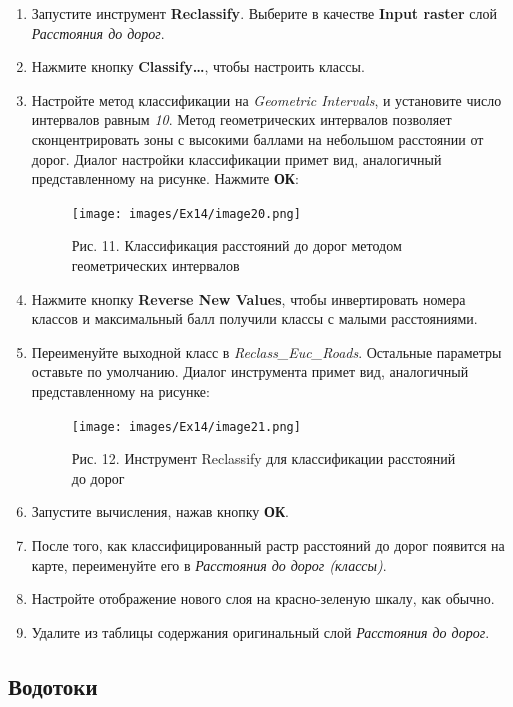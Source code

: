 \documentclass[12pt,]{book}
\begin{document}
\begin{enumerate}
\def\labelenumi{\arabic{enumi}.}
\item
  Запустите инструмент \textbf{Reclassify}. Выберите в качестве \textbf{Input raster} слой \emph{Расстояния до дорог}.
\item
  Нажмите кнопку \textbf{Classify\ldots{}}, чтобы настроить классы.
\item
  Настройте метод классификации на \emph{Geometric Intervals}, и установите число интервалов равным \emph{10}. Метод геометрических интервалов позволяет сконцентрировать зоны с высокими баллами на небольшом расстоянии от дорог. Диалог настройки классификации примет вид, аналогичный представленному на рисунке. Нажмите \textbf{ОК}:

  \begin{figure}
  \centering
  \texttt{[image: images/Ex14/image20.png]}
  \caption{Рис. 11. Классификация расстояний до дорог методом геометрических интервалов}
  \end{figure}
\item
  Нажмите кнопку \textbf{Reverse New Values}, чтобы инвертировать номера классов и максимальный балл получили классы с малыми расстояниями.
\item
  Переименуйте выходной класс в \emph{Reclass\_Euc\_Roads}. Остальные параметры оставьте по умолчанию. Диалог инструмента примет вид, аналогичный представленному на рисунке:

  \begin{figure}
  \centering
  \texttt{[image: images/Ex14/image21.png]}
  \caption{Рис. 12. Инструмент Reclassify для классификации расстояний до дорог}
  \end{figure}
\item
  Запустите вычисления, нажав кнопку \textbf{ОК}.
\item
  После того, как классифицированный растр расстояний до дорог появится на карте, переименуйте его в \emph{Расстояния до дорог (классы)}.
\item
  Настройте отображение нового слоя на красно-зеленую шкалу, как обычно.
\item
  Удалите из таблицы содержания оригинальный слой \emph{Расстояния до дорог}.
\end{enumerate}

\hypertarget{weighted-overlay-streams-classes}{%
\subsection{Водотоки}\label{weighted-overlay-streams-classes}}
\end{document}
